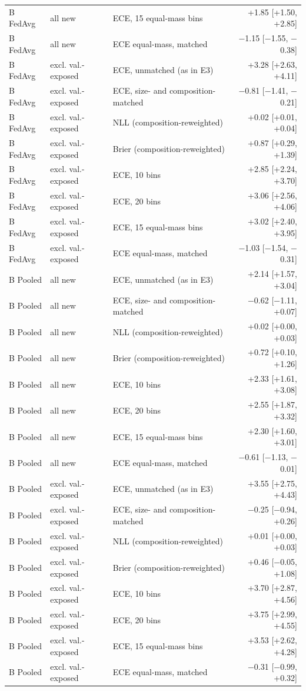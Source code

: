 \documentclass[10pt]{article}
\begin{document}
\begin{table}[!htbp]
\begin{tabular}{@{}lllr@{}}
B FedAvg & all new & ECE, 15 equal-mass bins & +1.85 [+1.50, +2.85] \\
B FedAvg & all new & ECE equal-mass, matched & $-$1.15 [$-$1.55, $-$0.38] \\
B FedAvg & excl. val.-exposed & ECE, unmatched (as in E3) & +3.28 [+2.63, +4.11] \\
B FedAvg & excl. val.-exposed & ECE, size- and composition-matched & $-$0.81 [$-$1.41, $-$0.21] \\
B FedAvg & excl. val.-exposed & NLL (composition-reweighted) & +0.02 [+0.01, +0.04] \\
B FedAvg & excl. val.-exposed & Brier (composition-reweighted) & +0.87 [+0.29, +1.39] \\
B FedAvg & excl. val.-exposed & ECE, 10 bins & +2.85 [+2.24, +3.70] \\
B FedAvg & excl. val.-exposed & ECE, 20 bins & +3.06 [+2.56, +4.06] \\
B FedAvg & excl. val.-exposed & ECE, 15 equal-mass bins & +3.02 [+2.40, +3.95] \\
B FedAvg & excl. val.-exposed & ECE equal-mass, matched & $-$1.03 [$-$1.54, $-$0.31] \\
\midrule
B Pooled & all new & ECE, unmatched (as in E3) & +2.14 [+1.57, +3.04] \\
B Pooled & all new & ECE, size- and composition-matched & $-$0.62 [$-$1.11, +0.07] \\
B Pooled & all new & NLL (composition-reweighted) & +0.02 [+0.00, +0.03] \\
B Pooled & all new & Brier (composition-reweighted) & +0.72 [+0.10, +1.26] \\
B Pooled & all new & ECE, 10 bins & +2.33 [+1.61, +3.08] \\
B Pooled & all new & ECE, 20 bins & +2.55 [+1.87, +3.32] \\
B Pooled & all new & ECE, 15 equal-mass bins & +2.30 [+1.60, +3.01] \\
B Pooled & all new & ECE equal-mass, matched & $-$0.61 [$-$1.13, $-$0.01] \\
B Pooled & excl. val.-exposed & ECE, unmatched (as in E3) & +3.55 [+2.75, +4.43] \\
B Pooled & excl. val.-exposed & ECE, size- and composition-matched & $-$0.25 [$-$0.94, +0.26] \\
B Pooled & excl. val.-exposed & NLL (composition-reweighted) & +0.01 [+0.00, +0.03] \\
B Pooled & excl. val.-exposed & Brier (composition-reweighted) & +0.46 [$-$0.05, +1.08] \\
B Pooled & excl. val.-exposed & ECE, 10 bins & +3.70 [+2.87, +4.56] \\
B Pooled & excl. val.-exposed & ECE, 20 bins & +3.75 [+2.99, +4.55] \\
B Pooled & excl. val.-exposed & ECE, 15 equal-mass bins & +3.53 [+2.62, +4.28] \\
B Pooled & excl. val.-exposed & ECE equal-mass, matched & $-$0.31 [$-$0.99, +0.32] \\
\bottomrule
\end{tabular}
\end{table}
\end{document}
